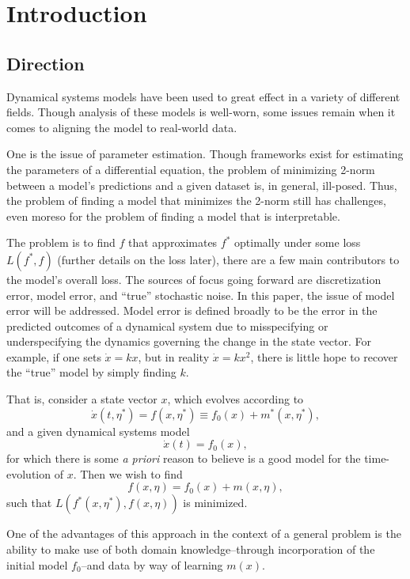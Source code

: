 \documentclass[12pt]{article}
\begin{document}
\section{Introduction}

\subsection{Direction}

Dynamical systems models have been used to great effect in a variety of different fields. Though analysis of these models is well-worn, some issues remain when it comes to aligning the model to real-world data.

One is the issue of parameter estimation. Though frameworks exist for estimating the parameters of a differential equation, the problem of minimizing 2-norm between a model's predictions and a given dataset is, in general, ill-posed\cite{chung}. Thus, the problem of finding a model that minimizes the 2-norm still has challenges, even moreso for the problem of finding a model that is interpretable.

The problem is to find $f$ that approximates $f^*$ optimally under some loss $L(f^*, f)$ (further details on the loss later), there are a few main contributors to the model's overall loss. The sources of focus going forward are discretization error, model error, and ``true'' stochastic noise. In this paper, the issue of model error will be addressed. Model error is defined broadly to be the error in the predicted outcomes of a dynamical system due to misspecifying or underspecifying the dynamics governing the change in the state vector. For example, if one sets $\dot{x} = k x$, but in reality $\dot{x} = k x^2$, there is little hope to recover the ``true'' model by simply finding $k$.

That is, consider a state vector $x$, which evolves according to $$\dot{x}(t, \eta^*) = f(x, \eta^*) \equiv f_0(x) + m^*(x, \eta^*),$$ and a given dynamical systems model $$\dot{x}(t) = f_0(x),$$ for which there is some \textit{a priori} reason to believe is a good model for the time-evolution of $x$. Then we wish to find $$f(x, \eta) = f_0(x) + m(x, \eta),$$ such that $L(f^*(x, \eta^*), f(x, \eta))$ is minimized.

One of the advantages of this approach in the context of a general problem is the ability to make use of both domain knowledge\---through incorporation of the initial model $f_0$\---and data by way of learning $m(x)$\cite{levine}.
\end{document}
